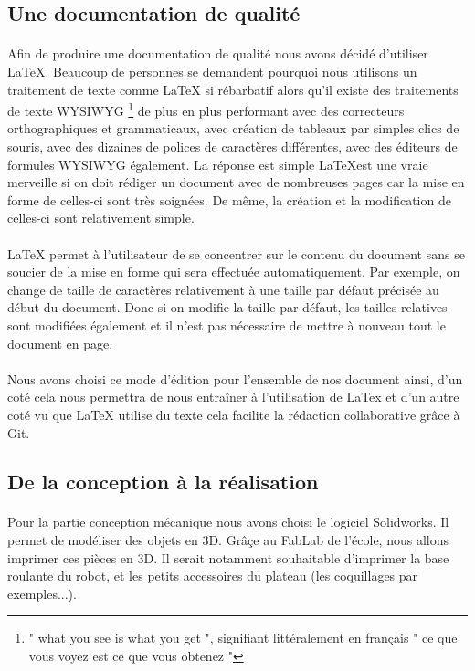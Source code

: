 \documentclass[12pt,a4paper]{article}
\begin{document}
\subsection{Une documentation de qualité}
\paragraph{}
Afin de produire une documentation de qualité nous avons décidé d'utiliser \LaTeX. 
Beaucoup de personnes se demandent pourquoi nous utilisons un traitement de texte comme LaTeX si 
rébarbatif alors qu'il existe des traitements de texte WYSIWYG \footnote{" what you see is what you get ", signifiant 
littéralement en français " ce que vous voyez est ce que vous obtenez "} de plus en plus performant avec 
des correcteurs orthographiques et grammaticaux, avec création de tableaux par simples clics de souris, 
avec des dizaines de polices de caractères différentes, avec des éditeurs de formules WYSIWYG également.
La réponse est simple \LaTeX  est une vraie merveille si on doit rédiger un document avec de nombreuses pages car la mise 
en forme de celles-ci sont très soignées. De même, la création et la modification de celles-ci sont relativement simple.

\paragraph{}
LaTeX permet à l'utilisateur de se concentrer sur le contenu du document sans se soucier de la mise en forme qui sera 
effectuée automatiquement. Par exemple, on change de taille de caractères relativement à une taille par défaut 
précisée au début du document. Donc si on modifie la taille par défaut, les tailles relatives sont modifiées également 
et il n'est pas nécessaire de mettre à nouveau tout le document en page.

\paragraph{}
Nous avons choisi ce mode d'édition pour l'ensemble de nos document ainsi, d'un coté cela nous permettra 
de nous entraîner à l'utilisation de LaTex et d'un autre coté vu que LaTeX utilise du texte cela 
facilite la rédaction collaborative grâce à Git. 

\subsection{De la conception à la réalisation}
\paragraph{}
Pour la partie conception mécanique nous avons choisi 
le logiciel Solidworks. Il permet de modéliser des objets en 3D. Grâçe au FabLab de l'école, nous allons imprimer 
ces pièces en 3D. Il serait notamment souhaitable d'imprimer la base roulante du robot, et les petits accessoires 
du plateau (les coquillages par exemples...).
\end{document}
